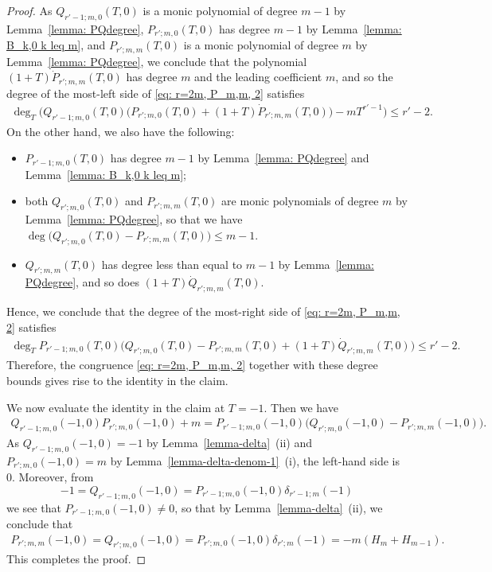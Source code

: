 \documentclass[11pt]{amsart}
\theoremstyle{definition}
\numberwithin{equation}{subsection}
\theoremstyle{plain}
\theoremstyle{plain}
\theoremstyle{plain}
\theoremstyle{plain}
\theoremstyle{plain}
\theoremstyle{plain}
\theoremstyle{plain}
\theoremstyle{plain}
\theoremstyle{plain}
\theoremstyle{plain}
\theoremstyle{plain}
\theoremstyle{plain}
\theoremstyle{definition}
\theoremstyle{definition}
\theoremstyle{definition}
\theoremstyle{remark}
\renewcommand{\(}{\textup{(}}
\renewcommand{\)}{\textup{)}}
\begin{document}
\begin{proof}
As $Q_{r'-1;m,0}(T,0)$ is a monic polynomial of degree $m-1$ by Lemma~\ref{lemma: PQdegree}, $P_{r';m,0}(T,0)$ has degree $m-1$ by Lemma~\ref{lemma: B_k,0 k leq m}, and $P_{r';m,m}(T,0)$ is a monic polynomial of degree $m$ by Lemma~\ref{lemma: PQdegree}, we conclude that the polynomial $(1+T)\dot{P}_{r';m,m}(T,0)$ has degree $m$ and the leading coefficient $m$, and so the degree of the most-left side of \eqref{eq: r=2m, P_m,m, 2} satisfies
    \begin{align*}
        \deg_T\Big(Q_{r'-1;m,0}(T,0)\big(P_{r';m,0}(T,0)+(1+T)\dot{P}_{r';m,m}(T,0)\big)-mT^{r'-1}\Big) \leq r'-2.
    \end{align*}
On the other hand, we also have the following:
    \begin{itemize}[leftmargin=*]
    \item $P_{r'-1;m,0}(T,0)$ has degree $m-1$ by Lemma~\ref{lemma: PQdegree} and Lemma~\ref{lemma: B_k,0 k leq m};
    \item both $Q_{r';m,0}(T,0)$ and $P_{r';m,m}(T,0)$ are monic polynomials of degree $m$ by Lemma~\ref{lemma: PQdegree}, so that we have
        $\deg \big(Q_{r';m,0}(T,0)-P_{r';m,m}(T,0)\big)\leq m-1$.
    \item $Q_{r';m,m}(T,0)$ has degree less than equal to $m-1$ by Lemma~\ref{lemma: PQdegree}, and so does $(1+T)\dot{Q}_{r';m,m}(T,0)$.
    \end{itemize}
Hence, we conclude that the degree of the most-right side of \eqref{eq: r=2m, P_m,m, 2} satisfies
    \begin{align*}
        \deg_T P_{r'-1;m,0}(T,0)\big(Q_{r';m,0}(T,0)-P_{r';m,m}(T,0)+(1+T)\dot{Q}_{r';m,m}(T,0)\big)\leq r'-2.
    \end{align*}
Therefore, the congruence \eqref{eq: r=2m, P_m,m, 2} together with these degree bounds gives rise to the identity in the claim.


We now evaluate the identity in the claim at $T=-1$. Then we have
    \begin{align*}
        Q_{r'-1;m,0}(-1,0)P_{r';m,0}(-1,0)+m =P_{r'-1;m,0}(-1,0)\big(Q_{r';m,0}(-1,0)-P_{r';m,m}(-1,0)\big).
    \end{align*}
As $Q_{r'-1;m,0}(-1,0)=-1$ by Lemma~\ref{lemma-delta}~(ii) and $P_{r';m,0}(-1,0)=m$ by Lemma~\ref{lemma-delta-denom-1}~(i), the left-hand side is $0$.
Moreover, from $$-1=Q_{r'-1;m,0}(-1,0) =P_{r'-1;m,0}(-1,0)\delta_{r'-1;m}(-1)$$
we see that $P_{r'-1;m,0}(-1,0)\not= 0$, so that by Lemma~\ref{lemma-delta}~(ii), we conclude that
    \begin{align*}
        P_{r';m,m}(-1,0) =Q_{r';m,0}(-1,0) =P_{r';m,0}(-1,0)\delta_{r';m}(-1) =-m(H_m+H_{m-1}).
    \end{align*}
This completes the proof.
\end{proof}
\end{document}
